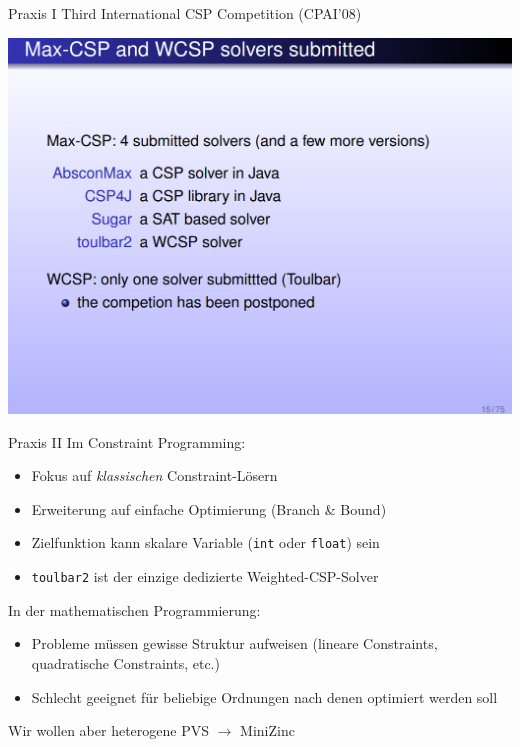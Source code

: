 
\begin{frame}{Praxis I}
Third International CSP Competition (CPAI’08)
\begin{center}
\includegraphics[width=.8\textwidth]{img/cpai08.png}
\end{center}
\end{frame}

\begin{frame}{Praxis II}
Im Constraint Programming:
\begin{itemize}
\item Fokus auf \emph{klassischen} Constraint-Lösern
\item Erweiterung auf einfache Optimierung (Branch \& Bound)
\item Zielfunktion kann skalare Variable (\texttt{int} oder \texttt{float}) sein
\item { \color{isseorange} \texttt{toulbar2} ist der einzige dedizierte Weighted-CSP-Solver}
\end{itemize}

\vspace*{2ex}

In der mathematischen Programmierung:

\begin{itemize}
\item Probleme müssen gewisse Struktur aufweisen (lineare Constraints, quadratische Constraints, etc.)
\item Schlecht geeignet für beliebige Ordnungen nach denen optimiert werden soll
\end{itemize}

\vspace*{1ex} \pause 
Wir wollen aber heterogene PVS $\rightarrow$ \alert{MiniZinc}
\end{frame}


